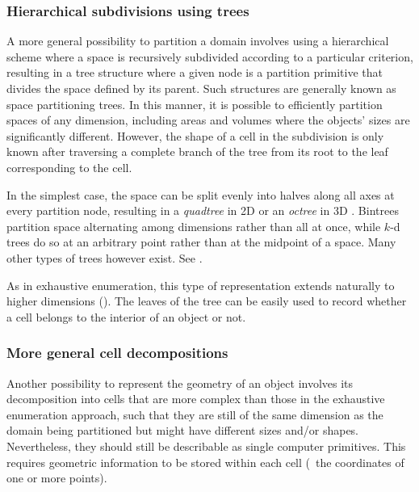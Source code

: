 \subsubsection{Hierarchical subdivisions using trees}

A more general possibility to partition a domain involves using a hierarchical scheme where a space is recursively subdivided according to a particular criterion, resulting in a tree structure where a given node is a partition primitive that divides the space defined by its parent.
Such structures are generally known as space partitioning trees.
In this manner, it is possible to efficiently partition spaces of any dimension, including areas and volumes where the objects' sizes are significantly different.
However, the shape of a cell in the subdivision is only known after traversing a complete branch of the tree from its root to the leaf corresponding to the cell.

In the simplest case, the space can be split evenly into halves along all axes at every partition node, resulting in a \emph{quadtree} in 2D \citep{Finkel74} or an \emph{octree} in 3D \citep{Meagher80}.
Bintrees \citep{Samet85} partition space alternating among dimensions rather than all at once, while $k$-d trees \citep{Bentley75} do so at an arbitrary point rather than at the midpoint of a space.
Many other types of trees however exist.
See \citep{Manolopoulos06}.

As in exhaustive enumeration, this type of representation extends naturally to higher dimensions ().
The leaves of the tree can be easily used to record whether a cell belongs to the interior of an object or not.

\subsubsection{More general cell decompositions}

Another possibility to represent the geometry of an object involves its decomposition into cells that are more complex than those in the exhaustive enumeration approach, such that they are still of the same dimension as the domain being partitioned but might have different sizes and/or shapes.
Nevertheless, they should still be describable as single computer primitives.
This requires geometric information to be stored within each cell (\eg\ the coordinates of one or more points).

